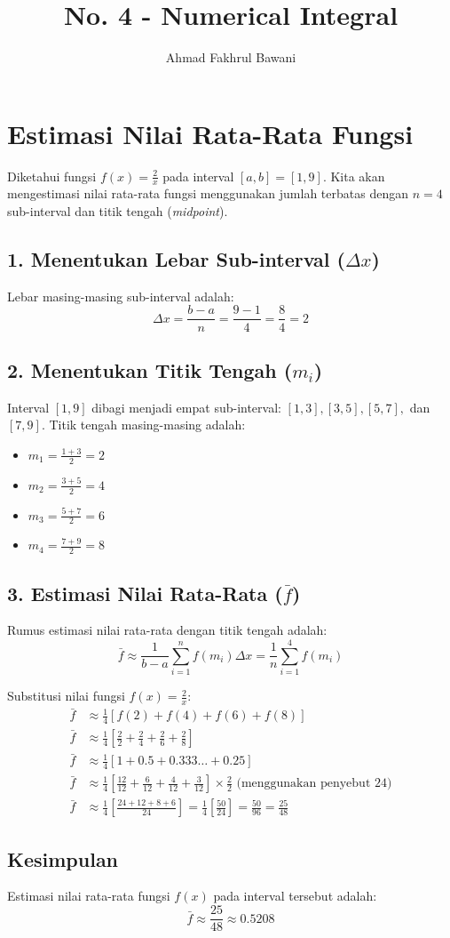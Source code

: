 \documentclass[12pt]{article}
\title{No. 4 - Numerical Integral}
\author{Ahmad Fakhrul Bawani}
\date{}
\begin{document}
\maketitle

\section*{Estimasi Nilai Rata-Rata Fungsi}

Diketahui fungsi $f(x) = \frac{2}{x}$ pada interval $[a, b] = [1, 9]$. Kita akan mengestimasi nilai rata-rata fungsi menggunakan jumlah terbatas dengan $n = 4$ sub-interval dan titik tengah (\textit{midpoint}).

\subsection*{1. Menentukan Lebar Sub-interval ($\Delta x$)}
Lebar masing-masing sub-interval adalah:
\[ \Delta x = \frac{b - a}{n} = \frac{9 - 1}{4} = \frac{8}{4} = 2 \]

\subsection*{2. Menentukan Titik Tengah ($m_i$)}
Interval $[1, 9]$ dibagi menjadi empat sub-interval: $[1, 3], [3, 5], [5, 7],$ dan $[7, 9]$. Titik tengah masing-masing adalah:
\begin{itemize}
    \item $m_1 = \frac{1+3}{2} = 2$
    \item $m_2 = \frac{3+5}{2} = 4$
    \item $m_3 = \frac{5+7}{2} = 6$
    \item $m_4 = \frac{7+9}{2} = 8$
\end{itemize}

\subsection*{3. Estimasi Nilai Rata-Rata ($\bar{f}$)}
Rumus estimasi nilai rata-rata dengan titik tengah adalah:
\[ \bar{f} \approx \frac{1}{b-a} \sum_{i=1}^{n} f(m_i) \Delta x = \frac{1}{n} \sum_{i=1}^{4} f(m_i) \]

Substitusi nilai fungsi $f(x) = \frac{2}{x}$:
\begin{align*}
\bar{f} &\approx \frac{1}{4} \left[ f(2) + f(4) + f(6) + f(8) \right] \\
\bar{f} &\approx \frac{1}{4} \left[ \frac{2}{2} + \frac{2}{4} + \frac{2}{6} + \frac{2}{8} \right] \\
\bar{f} &\approx \frac{1}{4} \left[ 1 + 0.5 + 0.333\dots + 0.25 \right] \\
\bar{f} &\approx \frac{1}{4} \left[ \frac{12}{12} + \frac{6}{12} + \frac{4}{12} + \frac{3}{12} \right] \times \frac{2}{2} \text{ (menggunakan penyebut 24)} \\
\bar{f} &\approx \frac{1}{4} \left[ \frac{24 + 12 + 8 + 6}{24} \right] = \frac{1}{4} \left[ \frac{50}{24} \right] = \frac{50}{96} = \frac{25}{48}
\end{align*}

\subsection*{Kesimpulan}
Estimasi nilai rata-rata fungsi $f(x)$ pada interval tersebut adalah:
\[ \bar{f} \approx \frac{25}{48} \approx 0.5208 \]
\end{document}
